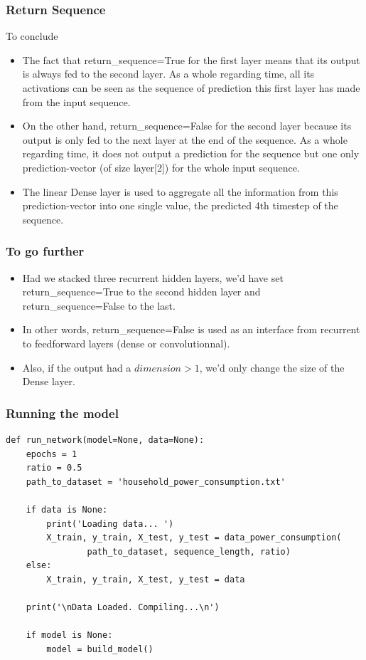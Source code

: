 \begin{frame}[fragile] \frametitle{Return Sequence}
To conclude
\begin{itemize}
\item The fact that return\_sequence=True for the first layer means that its output is always fed to the second layer. As a whole regarding time, all its activations can be seen as the sequence of prediction this first layer has made from the input sequence.
\item On the other hand, return\_sequence=False for the second layer because its output is only fed to the next layer at the end of the sequence. As a whole regarding time, it does not output a prediction for the sequence but one only prediction-vector (of size layer[2]) for the whole input sequence. 
\item The linear Dense layer is used to aggregate all the information from this prediction-vector into one single value, the predicted 4th timestep of the sequence.
\end{itemize}
\end{frame}

\begin{frame}[fragile] \frametitle{To go further}
\begin{itemize}
\item Had we stacked three recurrent hidden layers, we'd have set return\_sequence=True to the second hidden layer and return\_sequence=False to the last. 
\item In other words, return\_sequence=False is used as an interface from recurrent to feedforward layers (dense or convolutionnal).

\item Also, if the output had a $dimension > 1$, we'd only change the size of the Dense layer.
\end{itemize}
\end{frame}

\begin{frame}[fragile] \frametitle{Running the model}
\begin{lstlisting}
def run_network(model=None, data=None):
    epochs = 1
    ratio = 0.5
    path_to_dataset = 'household_power_consumption.txt'
    
    if data is None:
        print('Loading data... ')
        X_train, y_train, X_test, y_test = data_power_consumption(
                path_to_dataset, sequence_length, ratio)
    else:
        X_train, y_train, X_test, y_test = data

    print('\nData Loaded. Compiling...\n')

    if model is None:
        model = build_model()
\end{lstlisting}
\end{frame}


